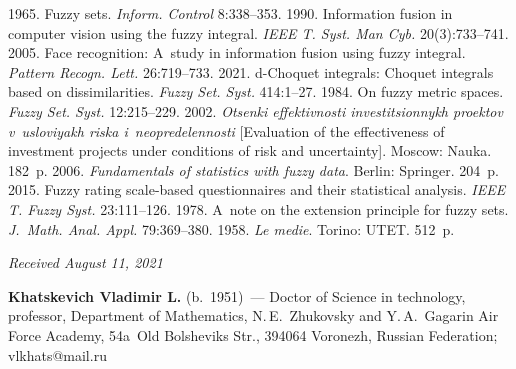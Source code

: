 \begin{multicols}{2}
{{\begin{thebibliography}{99}
 1965. Fuzzy sets. \textit{Inform. Control} 8:338--353.
 1990. Information fusion in computer vision using the fuzzy integral.
\textit{IEEE T. Syst. Man Cyb.} 20(3):733--741.
 2005. Face recognition: A~study in information fusion using fuzzy integral. \textit{Pattern Recogn. Lett.} 26:719--733.
 2021. d-Choquet integrals: Choquet integrals based on dissimilarities. \textit{Fuzzy Set. Syst.} 414:1--27.
 1984. On fuzzy metric spaces. \textit{Fuzzy Set.  Syst.} 12:215--229.
 2002. \textit{Otsenki effektivnosti investitsionnykh proektov v~usloviyakh riska i~neopredelennosti} 
[Evaluation of the effectiveness of investment projects under conditions of risk and uncertainty]. Moscow: Nauka. 182~p. 
 2006. \textit{Fundamentals of statistics with fuzzy data}. Berlin: Springer. 204~p.
 2015. Fuzzy rating scale-based questionnaires and their statistical analysis. \textit{IEEE T. Fuzzy Syst.} 23:111--126.
 1978. A~note on the extension principle for fuzzy sets. 
\textit{J.~Math. Anal. Appl.} 79:369--380.
 1958. \textit{Le medie}. Torino: UTET. 512~p.
\end{thebibliography}

 }
 }

\end{multicols}

\vspace*{-6pt}

\hfill{\small\textit{Received August 11, 2021}} 

\vspace*{-12pt}

\Contrl

\noindent
\textbf{Khatskevich Vladimir L.} (b.\ 1951)~--- 
Doctor of Science in technology, professor, Department of Mathematics, N.\,E.~Zhukovsky and Y.\,A.~Gagarin Air Force Academy, 
54a~Old Bolsheviks Str., 394064 Voronezh, Russian Federation; \mbox{vlkhats@mail.ru}


\label{end\stat}

\renewcommand{\bibname}{\protect\rm Литература}    